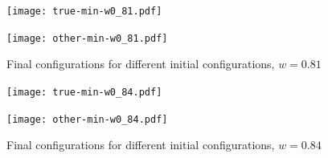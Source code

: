 \documentclass[12pt,oneside,final]{thesis}\usepackage[]{graphicx}\usepackage[]{color}
\begin{document}
\begin{figure}
\begin{minipage}[b]{0.46\linewidth}
\centering
\texttt{[image: true-min-w0\_81.pdf]}


\end{minipage}
\hspace{0.5cm}
\begin{minipage}[b]{0.46\linewidth}
\centering
\texttt{[image: other-min-w0\_81.pdf]}


\end{minipage}

\caption{Final configurations for different initial configurations, $w=0.81$ }
\label{fig:Finalconfig-MultMin-w-0_81}

\end{figure}




\begin{figure}
\begin{minipage}[b]{0.46\linewidth}
\centering
\texttt{[image: true-min-w0\_84.pdf]}

\label{fig:figure2-1}
\end{minipage}
\hspace{0.5cm}
\begin{minipage}[b]{0.46\linewidth}
\centering
\texttt{[image: other-min-w0\_84.pdf]}


\end{minipage}

\caption{Final configurations for different initial configurations, $w=0.84$ }
\label{fig:Finalconfig-MultMin-w-0_84}

\end{figure}



\end{document}
